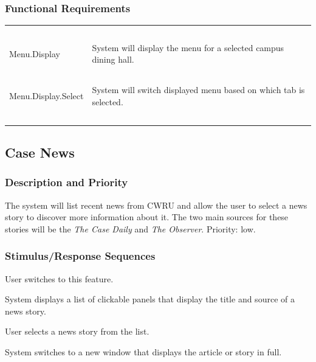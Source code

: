 \documentclass[pdftex,12pt,letter]{article}
\begin{document}
\subsubsection{Functional Requirements}
\begin{table}[!h]
\begin{tabularx}{\textwidth }[t]{|l Y|}
\hline
~&~\\
Menu.Display & System will display the menu for a selected campus dining hall.\\ 
~&~\\
Menu.Display.Select & System will switch displayed menu based on which tab is selected.\\
~&~\\
\hline
\end{tabularx}
\end{table}
\FloatBarrier
\subsection{Case News}
\subsubsection{Description and Priority}
The system will list recent news from CWRU and allow the user to select a news story to discover more information about it. The two main sources for these stories will be the \emph{The Case Daily} and \emph{The Observer}. Priority: low.
\subsubsection{Stimulus/Response Sequences}
\begin{description}\itemsep1pt
\item[Stimulus:] User switches to this feature.
\item[Response:] System displays a list of clickable panels that display the title and source of a news story.
\item[Stimulus:] User selects a news story from the list.
\item[Response:] System switches to a new window that displays the article or story in full.
\end{description}
\pagebreak
\end{document}
